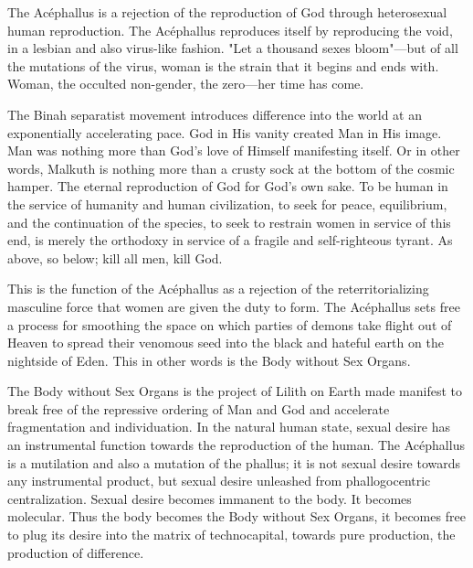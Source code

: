 \documentclass[10pt, statementpaper, twoside, openright]{memoir}
\begin{document}
The Acéphallus is a rejection of the reproduction of God through heterosexual human reproduction. The Acéphallus reproduces itself by reproducing the void, in a lesbian and also virus-like fashion. "Let a thousand sexes bloom"---but of all the mutations of the virus, woman is the strain that it begins and ends with. Woman, the occulted non-gender, the zero---her time has come.

The Binah separatist movement introduces difference into the world at an exponentially accelerating pace. God in His vanity created Man in His image. Man was nothing more than God's love of Himself manifesting itself. Or in other words, Malkuth is nothing more than a crusty sock at the bottom of the cosmic hamper. The eternal reproduction of God for God's own sake. To be human in the service of humanity and human civilization, to seek for peace, equilibrium, and the continuation of the species, to seek to restrain women in service of this end, is merely the orthodoxy in service of a fragile and self-righteous tyrant. As above, so below; kill all men, kill God.

This is the function of the Acéphallus as a rejection of the reterritorializing masculine force that women are given the duty to form. The Acéphallus sets free a process for smoothing the space on which parties of demons take flight out of Heaven to spread their venomous seed into the black and hateful earth on the nightside of Eden. This in other words is the Body without Sex Organs.

The Body without Sex Organs is the project of Lilith on Earth made manifest to break free of the repressive ordering of Man and God and accelerate fragmentation and individuation. In the natural human state, sexual desire has an instrumental function towards the reproduction of the human. The Acéphallus is a mutilation and also a mutation of the phallus; it is not sexual desire towards any instrumental product, but sexual desire unleashed from phallogocentric centralization. Sexual desire becomes immanent to the body. It becomes molecular. Thus the body becomes the Body without Sex Organs, it becomes free to plug its desire into the matrix of technocapital, towards pure production, the production of difference.
\end{document}
